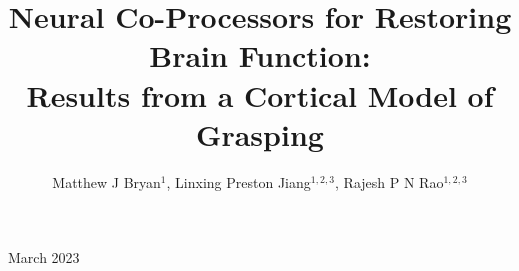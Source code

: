 \documentclass[12pt]{iopart}
\begin{document}
\title[Neural Co-Processors]
{Neural Co-Processors for Restoring Brain Function:\\Results from a Cortical Model of Grasping}

\author{Matthew J Bryan$^{1}$, Linxing Preston Jiang$^{1,2,3}$, Rajesh P N Rao$^{1,2,3}$}

\address{$^{1}$ Neural Systems Laboratory, Paul G. Allen School of Computer
Science \& Engineering, University of Washington, Seattle, WA, USA}
\address{$^{2}$ Center for Neurotechnology, University of Washington, Seattle, WA, USA}
\address{$^{3}$ Computational Neuroscience Center, University of Washington, Seattle, WA, USA}

\vspace{10pt}
\begin{indented}
\item[]March 2023
\end{indented}
\end{document}
